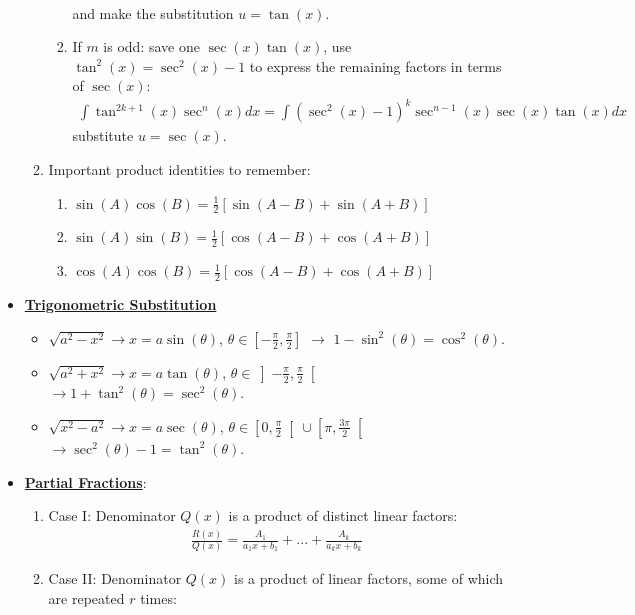 \documentclass[reqno,11pt]{amsart}
\theoremstyle{definition}
\theoremstyle{remark}
\newcommand{\dfn}[1]{\underline{\textbf{#1}}}
\begin{document}
\begin{itemize}[noitemsep]
\begin{enumerate}[noitemsep]
\begin{enumerate}[noitemsep]
\begin{align}
			\end{align}
			and make the substitution $u= \tan(x)$. 
			\item If $m$ is odd: save one $\sec(x) \tan(x)$, use $\tan^2(x) = \sec^2(x) - 1$ to express the remaining factors in terms of $\sec(x)$: 
			\begin{align}
				\int \tan^{2k+1} (x) \sec^n(x) dx = \int ( \sec^2(x) - 1)^k \sec^{n-1}(x) \sec(x) \tan(x) dx 	
			\end{align}
			substitute $u= \sec(x)$. 
		\end{enumerate}
	\item Important product identities to remember: 
	\begin{enumerate}[noitemsep]
		\item $\sin (A) \cos (B) = \frac{1}{2} [ \sin (A-B) + \sin (A+B) ]$
		\item $\sin (A) \sin (B) = \frac{1}{2} [ \cos (A-B) + \cos (A+B) ]$ 
		\item $\cos (A) \cos (B) = \frac{1}{2} [ \cos (A-B) + \cos (A+B) ]$
	\end{enumerate}
	\end{enumerate}
	\item \dfn{Trigonometric Substitution} 
	\begin{itemize}[noitemsep]
		\item $\sqrt{a^2 - x^2} \rightarrow x = a \sin ( \theta)$, $\theta \in \left[ - \frac{\pi}{2}, \frac{\pi}{2} \right]$ $\rightarrow$ $1 - \sin^2 (\theta ) = \cos^2 (\theta)$. 
		\item $\sqrt{a^2 + x^2} \rightarrow x = a \tan ( \theta)$, $ \theta \in \left] - \frac{\pi}{2}, \frac{\pi}{2} \right[$ $\rightarrow 1 + \tan^2 (\theta) = \sec^2 (\theta)$. 
		\item $\sqrt{x^2 - a^2} \rightarrow x = a \sec (\theta)$, $ \theta \in \left[ 0, \frac{\pi}{2} \right[ \cup \left[ \pi, \frac{3 \pi}{2} \right[$ $\rightarrow \sec^2 (\theta) - 1 = \tan^2(\theta)$. 
	\end{itemize}
	\item \dfn{Partial Fractions}: 
	\begin{enumerate}[noitemsep]
		\item Case I: Denominator $Q(x)$ is a product of distinct linear factors: 
		\begin{align}
			\frac{R(x)}{Q(x)} = \frac{A_1}{a_1x+b_1} + ... + \frac{A_k}{a_k x + b_k}	
		\end{align}
		\item Case II: Denominator $Q(x)$ is a product of linear factors, some of which are repeated $r$ times: 

\end{enumerate}
\end{itemize}
\end{document}
